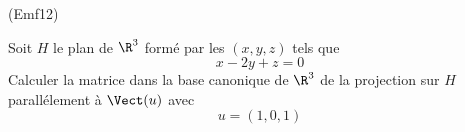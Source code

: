 \begin{tiny}(Emf12)\end{tiny} Soit $H$ le plan de $\R^3$ formé par les $(x,y,z)$ tels que
\begin{displaymath}
 x-2y+z=0
\end{displaymath}
Calculer la matrice dans la base canonique de $\R^3$ de la projection sur $H$ parallélement à $\Vect(u)$ avec
\begin{displaymath}
 u=(1,0,1)
\end{displaymath}
